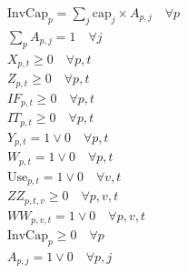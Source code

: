 \documentclass[10pt]{article}
\begin{document}
\begin{gather}
    \text{InvCap}_p = \sum_j\text{cap}_j\times A_{p, j}\quad\forall p\\
    \sum_p A_{p, j} = 1 \quad\forall j\\
    X_{p, t}\ge 0 \quad\forall  p, t\\
    Z_{p, t}\ge 0 \quad\forall  p, t\\
    IF_{p, t}\ge 0 \quad\forall  p, t\\
    IT_{p, t}\ge 0 \quad\forall  p, t\\
    Y_{p, t} = 1 \lor 0 \quad\forall  p, t\\
    W_{p, t} = 1 \lor 0 \quad\forall  p, t\\
    \text{Use}_{p, t} = 1 \lor 0 \quad\forall  v, t\\
    ZZ_{p, t, v}\ge 0 \quad\forall p, v, t\\
    WW_{p, v, t} = 1\lor 0 \quad\forall p, v, t\\
    \text{InvCap}_p \ge 0 \quad\forall p\\
    A_{p, j} = 1\lor 0 \quad\forall p, j
\end{gather}
\newpage 
\end{document}

